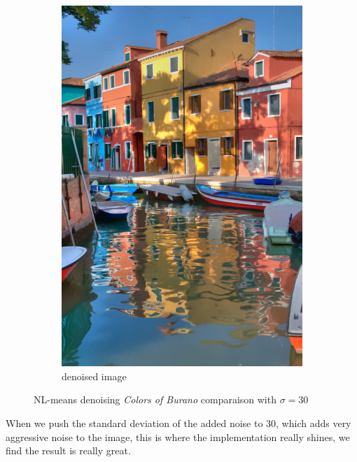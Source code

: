 \documentclass[a4paper, twocolumn, twoside]{article}
\begin{document}
\begin{figure}[h!]
\begin{subfigure}{.32\textwidth}
        \includegraphics[width=\linewidth]{images/denoised_30.png}
        \caption{denoised image}
    \end{subfigure}
    \caption{NL-means denoising \textit{Colors of Burano} \cite{color} comparaison with $\sigma = 30$}
\end{figure}
When we push the standard deviation of the added noise to 30,
which adds very aggressive noise to the image,
this is where the implementation really shines, we find the result is really great.\\
\newpage
\end{document}
